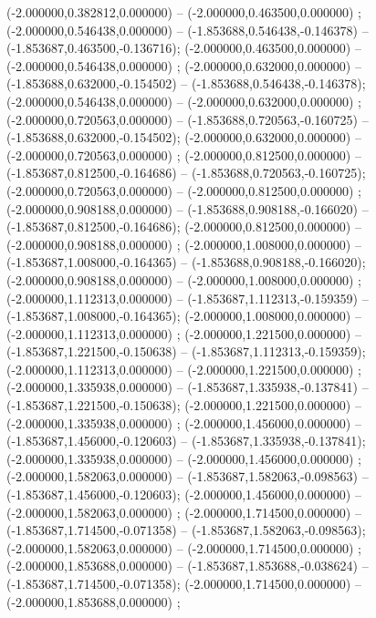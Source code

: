 (-2.000000,0.382812,0.000000) -- (-2.000000,0.463500,0.000000) ;
 (-2.000000,0.546438,0.000000) -- (-1.853688,0.546438,-0.146378) -- (-1.853687,0.463500,-0.136716);
 (-2.000000,0.463500,0.000000) -- (-2.000000,0.546438,0.000000) ;
 (-2.000000,0.632000,0.000000) -- (-1.853688,0.632000,-0.154502) -- (-1.853688,0.546438,-0.146378);
 (-2.000000,0.546438,0.000000) -- (-2.000000,0.632000,0.000000) ;
 (-2.000000,0.720563,0.000000) -- (-1.853688,0.720563,-0.160725) -- (-1.853688,0.632000,-0.154502);
 (-2.000000,0.632000,0.000000) -- (-2.000000,0.720563,0.000000) ;
 (-2.000000,0.812500,0.000000) -- (-1.853687,0.812500,-0.164686) -- (-1.853688,0.720563,-0.160725);
 (-2.000000,0.720563,0.000000) -- (-2.000000,0.812500,0.000000) ;
 (-2.000000,0.908188,0.000000) -- (-1.853688,0.908188,-0.166020) -- (-1.853687,0.812500,-0.164686);
 (-2.000000,0.812500,0.000000) -- (-2.000000,0.908188,0.000000) ;
 (-2.000000,1.008000,0.000000) -- (-1.853687,1.008000,-0.164365) -- (-1.853688,0.908188,-0.166020);
 (-2.000000,0.908188,0.000000) -- (-2.000000,1.008000,0.000000) ;
 (-2.000000,1.112313,0.000000) -- (-1.853687,1.112313,-0.159359) -- (-1.853687,1.008000,-0.164365);
 (-2.000000,1.008000,0.000000) -- (-2.000000,1.112313,0.000000) ;
 (-2.000000,1.221500,0.000000) -- (-1.853687,1.221500,-0.150638) -- (-1.853687,1.112313,-0.159359);
 (-2.000000,1.112313,0.000000) -- (-2.000000,1.221500,0.000000) ;
 (-2.000000,1.335938,0.000000) -- (-1.853687,1.335938,-0.137841) -- (-1.853687,1.221500,-0.150638);
 (-2.000000,1.221500,0.000000) -- (-2.000000,1.335938,0.000000) ;
 (-2.000000,1.456000,0.000000) -- (-1.853687,1.456000,-0.120603) -- (-1.853687,1.335938,-0.137841);
 (-2.000000,1.335938,0.000000) -- (-2.000000,1.456000,0.000000) ;
 (-2.000000,1.582063,0.000000) -- (-1.853687,1.582063,-0.098563) -- (-1.853687,1.456000,-0.120603);
 (-2.000000,1.456000,0.000000) -- (-2.000000,1.582063,0.000000) ;
 (-2.000000,1.714500,0.000000) -- (-1.853687,1.714500,-0.071358) -- (-1.853687,1.582063,-0.098563);
 (-2.000000,1.582063,0.000000) -- (-2.000000,1.714500,0.000000) ;
 (-2.000000,1.853688,0.000000) -- (-1.853687,1.853688,-0.038624) -- (-1.853687,1.714500,-0.071358);
 (-2.000000,1.714500,0.000000) -- (-2.000000,1.853688,0.000000) ;
